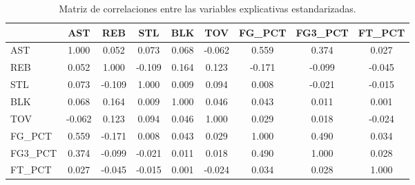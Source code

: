 \begin{table}[h]
\centering
\caption{Matriz de correlaciones entre las variables explicativas estandarizadas.}
\label{tab:correlaciones}
\begin{tabular}{lcccccccc}
\toprule
 & AST & REB & STL & BLK & TOV & FG\_PCT & FG3\_PCT & FT\_PCT \\
\midrule
AST & 1.000 & 0.052 & 0.073 & 0.068 & -0.062 & 0.559 & 0.374 & 0.027 \\
REB & 0.052 & 1.000 & -0.109 & 0.164 & 0.123 & -0.171 & -0.099 & -0.045 \\
STL & 0.073 & -0.109 & 1.000 & 0.009 & 0.094 & 0.008 & -0.021 & -0.015 \\
BLK & 0.068 & 0.164 & 0.009 & 1.000 & 0.046 & 0.043 & 0.011 & 0.001 \\
TOV & -0.062 & 0.123 & 0.094 & 0.046 & 1.000 & 0.029 & 0.018 & -0.024 \\
FG\_PCT & 0.559 & -0.171 & 0.008 & 0.043 & 0.029 & 1.000 & 0.490 & 0.034 \\
FG3\_PCT & 0.374 & -0.099 & -0.021 & 0.011 & 0.018 & 0.490 & 1.000 & 0.028 \\
FT\_PCT & 0.027 & -0.045 & -0.015 & 0.001 & -0.024 & 0.034 & 0.028 & 1.000 \\
\bottomrule
\end{tabular}
\end{table}
